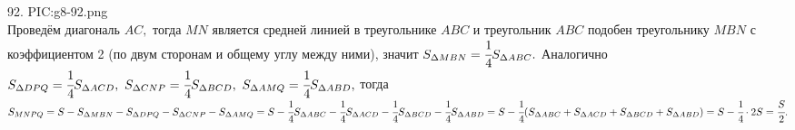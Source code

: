 92. {{PIC:g8-92.png}}\\
Проведём диагональ $AC,$ тогда $MN$ является средней линией в треугольнике $ABC$ и треугольник $ABC$ подобен треугольнику $MBN$ с коэффициентом 2 (по двум сторонам и общему углу между ними), значит $S_{\Delta MBN}=\cfrac{1}{4}S_{\Delta ABC}.$ Аналогично $S_{\Delta DPQ}=\cfrac{1}{4}S_{\Delta ACD},\  S_{\Delta CNP}=\cfrac{1}{4}S_{\Delta BCD},\ S_{\Delta AMQ}=\cfrac{1}{4}S_{\Delta ABD},$ тогда $S_{MNPQ}=S-S_{\Delta MBN}-S_{\Delta DPQ}-S_{\Delta CNP}-S_{\Delta AMQ}=
S-\cfrac{1}{4}S_{\Delta ABC}-\cfrac{1}{4}S_{\Delta ACD}-\cfrac{1}{4}S_{\Delta BCD}-\cfrac{1}{4}S_{\Delta ABD}=S-\cfrac{1}{4}(S_{\Delta ABC}+S_{\Delta ACD}+
S_{\Delta BCD}+S_{\Delta ABD})=S-\cfrac{1}{4}\cdot2S=\cfrac{S}{2}.$\\
